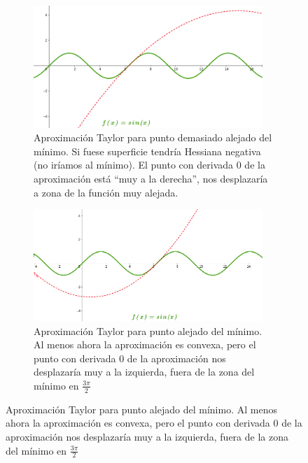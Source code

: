 \documentclass[11pt,a4paper]{article}
\theoremstyle{definition}
\begin{document}
	\begin{figure}[H]
		\centering
		\begin{subfigure}{.5\textwidth}
  		\centering
  		\includegraphics[width=0.95\textwidth]{images/ilus_newton1}
  		\caption{Aproximación Taylor para punto demasiado alejado del mínimo. Si fuese superficie tendría Hessiana negativa (no iríamos al mínimo). El punto con derivada 0 de la aproximación está ``muy a la derecha'', nos desplazaría a zona de la función muy alejada.}
  		\label{fig:f2}
		\end{subfigure}%
		\begin{subfigure}{.5\textwidth}
  		\centering
  		\includegraphics[width=0.95\textwidth]{images/ilus_newton2}
  		\caption{Aproximación Taylor para punto alejado del mínimo. Al menos ahora la aproximación es convexa, pero el punto con derivada 0 de la aproximación nos desplazaría muy a la izquierda, fuera de la zona del mínimo en $\frac{3\pi}{2}$}
  		\label{fig:f1}
		\end{subfigure}
		\label{fig:test}	
	\end{figure}
	\newpage
\end{document}
